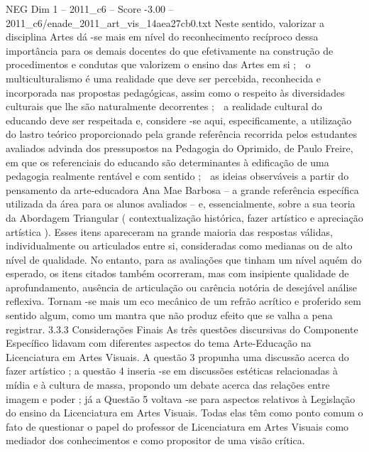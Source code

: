 \begin{textsample}{NEG Dim 1 – 2011\_c6 – Score -3.00 – 2011\_c6/enade\_2011\_art\_vis\_14aea27cb0.txt}
Neste sentido, valorizar a disciplina Artes dá -se mais em nível do reconhecimento recíproco dessa importância para os demais docentes do que efetivamente na construção de procedimentos e condutas que valorizem o ensino das Artes em si ;  o multiculturalismo é uma realidade que deve ser percebida, reconhecida e incorporada nas propostas pedagógicas, assim como o respeito às diversidades culturais que lhe são naturalmente decorrentes ;  a realidade cultural do educando deve ser respeitada e, considere -se aqui, especificamente, a utilização do lastro teórico proporcionado pela grande referência recorrida pelos estudantes avaliados advinda dos pressupostos na Pedagogia do Oprimido, de Paulo Freire, em que os referenciais do educando são determinantes à edificação de uma pedagogia realmente rentável e com sentido ;  as ideias observáveis a partir do pensamento da arte-educadora Ana Mae Barbosa – a grande referência específica utilizada da área para os alunos avaliados – e, essencialmente, sobre a sua teoria da Abordagem Triangular ( contextualização histórica, fazer artístico e apreciação artística ).
Esses itens apareceram na grande maioria das respostas válidas, individualmente ou articulados entre si, consideradas como medianas ou de alto nível de qualidade.
No entanto, para as avaliações que tinham um nível aquém do esperado, os itens citados também ocorreram, mas com insipiente qualidade de aprofundamento, ausência de articulação ou carência notória de desejável análise reflexiva.
Tornam -se mais um eco mecânico de um refrão acrítico e proferido sem sentido algum, como um mantra que não produz efeito que se valha a pena registrar. 3.3.3 Considerações Finais As três questões discursivas do Componente Específico lidavam com diferentes aspectos do tema Arte-Educação na Licenciatura em Artes Visuais.
A questão 3 propunha uma discussão acerca do fazer artístico ; a questão 4 inseria -se em discussões estéticas relacionadas à mídia e à cultura de massa, propondo um debate acerca das relações entre imagem e poder ; já a Questão 5 voltava -se para aspectos relativos à Legislação do ensino da Licenciatura em Artes Visuais.
Todas elas têm como ponto comum o fato de questionar o papel do professor de Licenciatura em Artes Visuais como mediador dos conhecimentos e como propositor de uma visão crítica.

\end{textsample}
